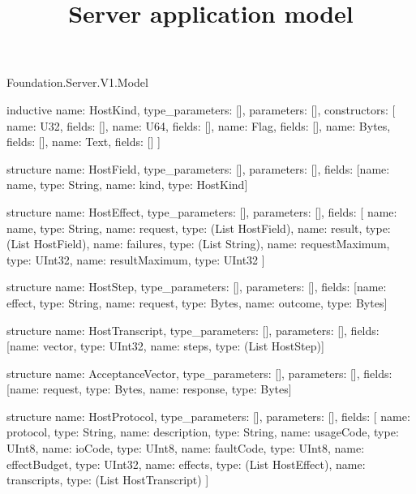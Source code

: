 \begin{lexlean}{Foundation.Server.V1.Model}
\title{Server application model}
\begin{semanticmodule}
inductive{
  name: HostKind,
  type_parameters: [],
  parameters: [],
  constructors: [
    {name: U32, fields: []},
    {name: U64, fields: []},
    {name: Flag, fields: []},
    {name: Bytes, fields: []},
    {name: Text, fields: []}
  ]
}

structure{
  name: HostField,
  type_parameters: [],
  parameters: [],
  fields: [{name: name, type: String}, {name: kind, type: HostKind}]
}

structure{
  name: HostEffect,
  type_parameters: [],
  parameters: [],
  fields: [
    {name: name, type: String},
    {name: request, type: (List HostField)},
    {name: result, type: (List HostField)},
    {name: failures, type: (List String)},
    {name: requestMaximum, type: UInt32},
    {name: resultMaximum, type: UInt32}
  ]
}

structure{
  name: HostStep,
  type_parameters: [],
  parameters: [],
  fields: [{name: effect, type: String}, {name: request, type: Bytes}, {name: outcome, type: Bytes}]
}

structure{
  name: HostTranscript,
  type_parameters: [],
  parameters: [],
  fields: [{name: vector, type: UInt32}, {name: steps, type: (List HostStep)}]
}

structure{
  name: AcceptanceVector,
  type_parameters: [],
  parameters: [],
  fields: [{name: request, type: Bytes}, {name: response, type: Bytes}]
}

structure{
  name: HostProtocol,
  type_parameters: [],
  parameters: [],
  fields: [
    {name: protocol, type: String},
    {name: description, type: String},
    {name: usageCode, type: UInt8},
    {name: ioCode, type: UInt8},
    {name: faultCode, type: UInt8},
    {name: effectBudget, type: UInt32},
    {name: effects, type: (List HostEffect)},
    {name: transcripts, type: (List HostTranscript)}
  ]
}


\end{semanticmodule}
\end{lexlean}
